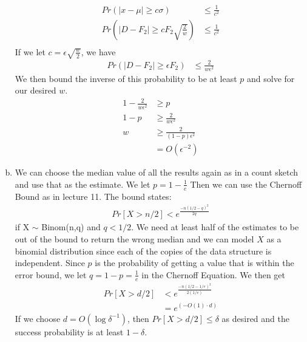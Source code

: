 \documentclass{article}
\theoremstyle{casestyle}
\begin{document}
\begin{enumerate}[a)]
\begin{align*}
  Pr \left(\left|x-\mu\right| \geq c\sigma \right) &\leq \frac{1}{c^2} \\
  Pr \left(\left|D-F_2\right| \geq cF_2\sqrt{\frac{2}{w}} \right) &\leq \frac{1}{c^2} \\
\end{align*} If we let $c=\epsilon\sqrt{\frac{w}{2}}$, we have 
\begin{align*}
  Pr \left(\left|D-F_2\right| \geq \epsilon F_2 \right) &\leq \frac{2}{w\epsilon^2}
\end{align*} We then bound the inverse of this probability to be at least $p$ and solve for our desired $w$.
\begin{align*}
  1 - \frac{2}{w\epsilon^2} &\geq p \\
  1 - p &\geq \frac{2}{w\epsilon^2} \\
  w &\geq \frac{2}{(1-p)\epsilon^2} \\
  &= O(\epsilon^{-2})
\end{align*}
\item We can choose the median value of all the results again as in a count sketch and use that as the estimate. We let $p=1-\frac{1}{e}$ Then we can use the Chernoff Bound as in lecture 11. The bound states:
\begin{align*}
  Pr\left[ X > n/2 \right] < e^{\frac{-n(1/2-q)^2}{2q}}
\end{align*} if X $\sim$ Binom(n,q) and $q<1/2$. We need at least half of the estimates to be out of the bound to return the wrong median and we can model $X$ as a binomial distribution since each of the copies of the data structure is independent. Since $p$ is the probability of getting a value that is within the error bound, we let $q=1-p=\frac{1}{e}$ in the Chernoff Equation. We then get
\begin{align*}
  Pr\left[ X > d/2 \right] &< e^{\frac{-n(1/2-1/e)^2}{2(1/e)}} \\
                           &= e^{(-O(1)\cdot d)}
\end{align*} If we choose $d=O(\log \delta ^{-1})$, then $Pr[X>d/2] \leq \delta$ as desired and the success probability is at least $1-\delta$.
\end{enumerate}
\end{document}
